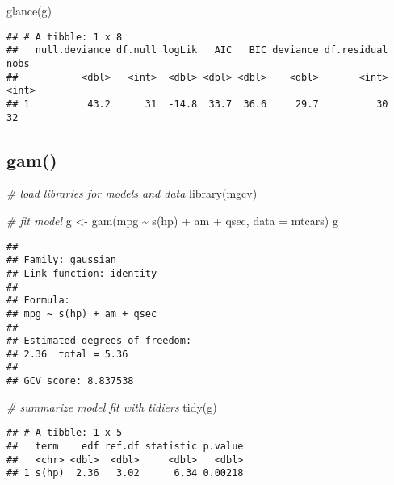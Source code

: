 \documentclass[
]{book}
\newenvironment{Shaded}{\begin{snugshade}}{\end{snugshade}}
\newcommand{\AttributeTok}[1]{\textcolor[rgb]{0.77,0.63,0.00}{#1}}
\newcommand{\CommentTok}[1]{\textcolor[rgb]{0.56,0.35,0.01}{\textit{#1}}}
\newcommand{\FunctionTok}[1]{\textcolor[rgb]{0.00,0.00,0.00}{#1}}
\newcommand{\NormalTok}[1]{#1}
\newcommand{\OtherTok}[1]{\textcolor[rgb]{0.56,0.35,0.01}{#1}}
\newcommand{\SpecialCharTok}[1]{\textcolor[rgb]{0.00,0.00,0.00}{#1}}
\begin{document}
\begin{Shaded}
\begin{Highlighting}[]
\FunctionTok{glance}\NormalTok{(g)}
\end{Highlighting}
\end{Shaded}

\begin{verbatim}
## # A tibble: 1 x 8
##   null.deviance df.null logLik   AIC   BIC deviance df.residual  nobs
##           <dbl>   <int>  <dbl> <dbl> <dbl>    <dbl>       <int> <int>
## 1          43.2      31  -14.8  33.7  36.6     29.7          30    32
\end{verbatim}

\hypertarget{gam}{%
\subsection{gam()}\label{gam}}

\begin{Shaded}
\begin{Highlighting}[]
\CommentTok{\# load libraries for models and data}
\FunctionTok{library}\NormalTok{(mgcv)}

\CommentTok{\# fit model}
\NormalTok{g }\OtherTok{\textless{}{-}} \FunctionTok{gam}\NormalTok{(mpg }\SpecialCharTok{\textasciitilde{}} \FunctionTok{s}\NormalTok{(hp) }\SpecialCharTok{+}\NormalTok{ am }\SpecialCharTok{+}\NormalTok{ qsec, }\AttributeTok{data =}\NormalTok{ mtcars)}
\NormalTok{g}
\end{Highlighting}
\end{Shaded}

\begin{verbatim}
## 
## Family: gaussian 
## Link function: identity 
## 
## Formula:
## mpg ~ s(hp) + am + qsec
## 
## Estimated degrees of freedom:
## 2.36  total = 5.36 
## 
## GCV score: 8.837538
\end{verbatim}

\begin{Shaded}
\begin{Highlighting}[]
\CommentTok{\# summarize model fit with tidiers}
\FunctionTok{tidy}\NormalTok{(g)}
\end{Highlighting}
\end{Shaded}

\begin{verbatim}
## # A tibble: 1 x 5
##   term    edf ref.df statistic p.value
##   <chr> <dbl>  <dbl>     <dbl>   <dbl>
## 1 s(hp)  2.36   3.02      6.34 0.00218
\end{verbatim}
\end{document}
